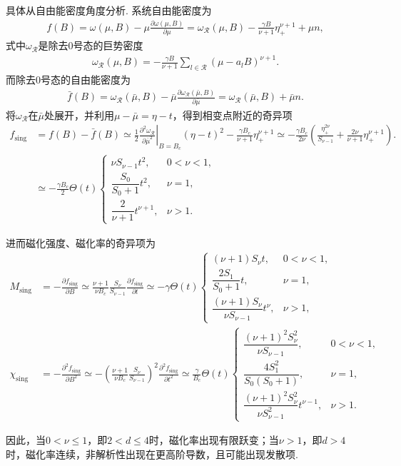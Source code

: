 具体从自由能密度角度分析. 系统自由能密度为
\begin{align*}
	f(B)
	=
	\omega(\mu,B)-\mu\frac{\partial\omega(\mu,B)}{\partial\mu}
	=
	\omega_{\mathcal{R}}(\mu,B)
	-\frac{\gamma B}{\nu+1}\eta_{+}^{\nu+1}
	+\mu n,
\end{align*}
式中\(\omega_{\mathcal{R}}\)是除去\(0\)号态的巨势密度
\begin{align*}
	\omega_{\mathcal{R}}(\mu,B)
	=
	-\frac{\gamma B}{\nu+1}
	\sum_{l\in\mathcal{R}}
	(\mu-a_{l}B)^{\nu+1}.
\end{align*}
而除去\(0\)号态的自由能密度为
\begin{align*}
	\bar{f}(B)
	=
	\omega_{\mathcal{R}}(\bar{\mu},B)
	-\bar{\mu}
	\frac{\partial\omega_{\mathcal{R}}(\bar{\mu},B)}{\partial\bar{\mu}}
	=
	\omega_{\mathcal{R}}(\bar{\mu},B)+\bar{\mu}n .
\end{align*}
将\(\omega_{\mathcal{R}}\)在\(\bar{\mu}\)处展开，并利用\(\mu-\bar{\mu}=\eta-t\)，得到相变点附近的奇异项
\begin{align*}
	f_{\mathrm{sing}}
	&=
	f(B)-\bar{f}(B)\simeq
	\frac{1}{2}
	\left.
	\frac{\partial^{2}\omega_{\mathcal{R}}}{\partial\bar{\mu}^{2}}
	\right|_{B=B_{c}}
	(\eta-t)^{2}
	-\frac{\gamma B_{c}}{\nu+1}\eta_{+}^{\nu+1}
	\simeq
	-\frac{\gamma B_{c}}{2\nu}
	\left(
		\frac{\eta_{+}^{2\nu}}{S_{\nu-1}}
		+
		\frac{2\nu}{\nu+1}\eta_{+}^{\nu+1}
	\right).\\
	&\simeq
	-\frac{\gamma B_{c}}{2}
	\Theta(t)
	\begin{cases}
		\nu S_{\nu-1}t^{2},
		&0<\nu<1,\\[4pt]
		\dfrac{S_{0}}{S_{0}+1}t^{2},
		&\nu=1,\\[8pt]
		\dfrac{2}{\nu+1}t^{\nu+1},
		&\nu>1.
	\end{cases}
\end{align*}

进而磁化强度、磁化率的奇异项为
\begin{align*}
	M_{\mathrm{sing}}&
	=
	-\frac{\partial f_{\mathrm{sing}}}{\partial B}
	\simeq
	\frac{\nu+1}{\nu B_{c}}\frac{S_{\nu}}{S_{\nu-1}}
	\frac{\partial f_{\mathrm{sing}}}{\partial t}
	\simeq
	-\gamma\Theta(t)
	\begin{cases}
		(\nu+1)S_{\nu}t,
		&0<\nu<1,\\[4pt]
		\dfrac{2S_{1}}{S_{0}+1}t,
		&\nu=1,\\[8pt]
		\dfrac{(\nu+1)S_{\nu}}{\nu S_{\nu-1}}t^{\nu},
		&\nu>1,
	\end{cases}\\[8pt]
	\chi_{\mathrm{sing}}&
	=
	-\frac{\partial^{2}f_{\mathrm{sing}}}{\partial B^{2}}
	\simeq
	-\left(
	\frac{\nu+1}{\nu B_{c}}\frac{S_{\nu}}{S_{\nu-1}}
	\right)^{2}
	\frac{\partial^{2}f_{\mathrm{sing}}}{\partial t^{2}}\simeq
	\frac{\gamma}{B_{c}}
	\Theta(t)
	\begin{cases}
		\dfrac{(\nu+1)^{2}S_{\nu}^{2}}{\nu S_{\nu-1}},
		&0<\nu<1,\\[12pt]
		\dfrac{4S_{1}^{2}}{S_{0}(S_{0}+1)},
		&\nu=1,\\[12pt]
		\dfrac{(\nu+1)^{2}S_{\nu}^{2}}{\nu S_{\nu-1}^{2}}t^{\nu-1},
		&\nu>1.
	\end{cases}
\end{align*}

因此，当\(0<\nu\le1\)，即\(2<d\le4\)时，磁化率出现有限跃变；当\(\nu>1\)，即\(d>4\)时，磁化率连续，非解析性出现在更高阶导数，且可能出现发散项.
